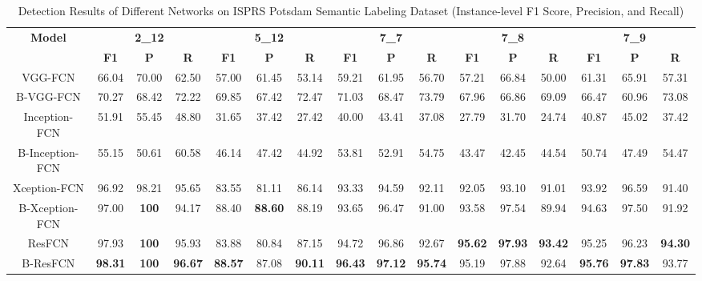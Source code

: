 \documentclass[journal]{IEEEtran}
\begin{document}
\begin{table*}[t]
\caption{\label{tab:det_potsdam} Detection Results of Different Networks on ISPRS Potsdam Semantic Labeling Dataset (Instance-level F1 Score, Precision, and Recall)}
\centering
\begin{tabular}{cccccccccccccccc}
\toprule
\multirow{2}{*}{\textbf{Model}} & \multicolumn{3}{c}{\textbf{2\_12}} & \multicolumn{3}{c}{\textbf{5\_12}} & \multicolumn{3}{c}{\textbf{7\_7}} & \multicolumn{3}{c}{\textbf{7\_8}} & \multicolumn{3}{c}{\textbf{7\_9}} \\
\cline{2-16}
 & \textbf{F1} & \textbf{P} & \textbf{R} & \textbf{F1} & \textbf{P} & \textbf{R} & \textbf{F1} & \textbf{P} & \textbf{R} & \textbf{F1} & \textbf{P} & \textbf{R} & \textbf{F1} & \textbf{P} & \textbf{R} \\
\hline
VGG-FCN & 66.04 & 70.00 & 62.50 & 57.00 & 61.45 & 53.14 & 59.21 & 61.95 & 56.70 & 57.21 & 66.84 & 50.00 & 61.31 & 65.91 & 57.31 \\
B-VGG-FCN & 70.27 & 68.42 & 72.22 & 69.85 & 67.42 & 72.47 & 71.03 & 68.47 & 73.79 & 67.96 & 66.86 & 69.09 & 66.47 & 60.96 & 73.08 \\
Inception-FCN & 51.91 & 55.45 & 48.80 & 31.65 & 37.42 & 27.42 & 40.00 & 43.41 & 37.08 & 27.79 & 31.70 & 24.74& 40.87 & 45.02 & 37.42 \\
B-Inception-FCN & 55.15 & 50.61 & 60.58 & 46.14 & 47.42 & 44.92 & 53.81 & 52.91 & 54.75 & 43.47 & 42.45 & 44.54 & 50.74 & 47.49 & 54.47 \\
Xception-FCN & 96.92 & 98.21 & 95.65 & 83.55 & 81.11 & 86.14 & 93.33 & 94.59 & 92.11 & 92.05 & 93.10 & 91.01 & 93.92 & 96.59 & 91.40 \\
B-Xception-FCN & 97.00 & \textbf{100} & 94.17 & 88.40 & \textbf{88.60} & 88.19 & 93.65 & 96.47 & 91.00 & 93.58 & 97.54 & 89.94 & 94.63 & 97.50 & 91.92 \\
ResFCN & 97.93 & \textbf{100} & 95.93 & 83.88 & 80.84 & 87.15 & 94.72 & 96.86 & 92.67 & \textbf{95.62} & \textbf{97.93} & \textbf{93.42} & 95.25 & 96.23 & \textbf{94.30} \\
B-ResFCN & \textbf{98.31} & \textbf{100} & \textbf{96.67} & \textbf{88.57} & 87.08 & \textbf{90.11} & \textbf{96.43} & \textbf{97.12} & \textbf{95.74} & 95.19 & 97.88 & 92.64 & \textbf{95.76} & \textbf{97.83} & 93.77 \\
\bottomrule
\end{tabular}
\end{table*}
\end{document}
